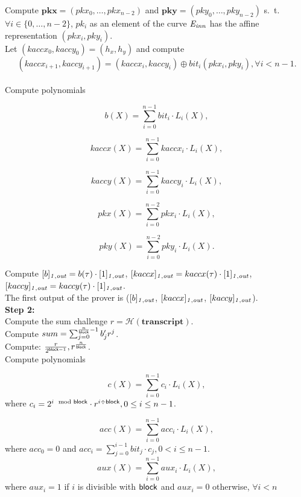 \noindent Compute $\mathbf{pkx} = (\mathit{pkx_0}, \ldots, \mathit{pkx_{n-2}})$ and $\mathbf{pky} = (\mathit{pky_0}, \ldots, \mathit{pky_{n-2}})$ s.\ t.\  
$\forall i \in \{0, \ldots, n-2\}$, $\mathit{pk_i}$ as an element of the curve $\mathit{E}_{\mathit{inn}}$ has the affine representation $(\mathit{pkx_i}, \mathit{pky_i})$. \\

\noindent Let $(kaccx_{0}, kaccy_{0}) = (h_x, h_y)$ and 
compute $$(kaccx_{i+1}, kaccy_{i+1}) =  (kaccx_{i}, kaccy_{i}) \oplus \mathit{bit_i}(pkx_{i}, pky_{i}), \forall i < n-1.$$ \\ 

\noindent Compute polynomials 

$$b(X) = \sum_{i=0}^{n-1} \mathit{bit_i} \cdot L_i(X),$$

$$kaccx(X) = \sum_{i=0}^{n-1} kaccx_i \cdot L_i(X),$$

$$kaccy(X) = \sum_{i=0}^{n-1} kaccy_i \cdot L_i(X),$$

$$pkx(X) = \sum_{i=0}^{n-2} pkx_i \cdot L_i(X),$$

$$pky(X) = \sum_{i=0}^{n-2} pky_i \cdot L_i(X).$$

\noindent Compute $[b]_{\mathit{1,out}} = b(\tau)\cdot[1]_{\mathit{1,out}}$, $[kaccx]_{\mathit{1,out}} = kaccx(\tau) \cdot [1]_{\mathit{1,out}}$, $[kaccy]_{\mathit{1,out}} = kaccy(\tau)\cdot [1]_{\mathit{1,out}}$. \\

\noindent The first output of the prover is ($[b]_{\mathit{1,out}}$, $[kaccx]_{\mathit{1,out}}$, $[kaccy]_{\mathit{1,out}}$). \\

\noindent \textbf{Step 2:} \\
\noindent Compute the sum challenge $r = \mathcal{H}(\mathbf{transcript})$. \\

\noindent Compute $sum = \sum_{j=0}^{\frac{n}{\mathsf{block}}-1} b'_{j} r^j$.\\

\noindent Compute: $\frac{r}{2^{\mathsf{block} -1}}, r^{\frac{n}{\mathsf{block}}}$. \\

\noindent Compute polynomials 

$$c(X) = \sum_{i=0}^{n-1} c_i \cdot L_{i}(X),$$ 
where $c_i =  2^{i\mod {\mathsf{block}}}\cdot r^{i\div \mathsf{block}}, 0 \leq i \leq n-1 $. 

$$acc(X) = \sum_{i=0}^{n-1} acc_i \cdot L_{i}(X),$$ 
where $acc_0 = 0$ and $acc_i = \sum_{j=0}^{i-1} \mathit{bit_j} \cdot c_j, 0 < i \leq n-1$. 
$$aux(X) = \sum_{i=0}^{n-1} aux_i \cdot L_{i}(X),$$
where $aux_{i} = 1$ if $i$ is divisible with $\mathsf{block}$ and $aux_{i} = 0$ otherwise, $\forall i < n$ \\

